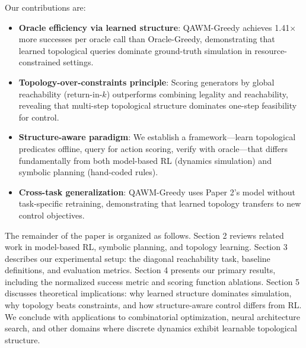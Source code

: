 Our contributions are:

\begin{itemize}
\item \textbf{Oracle efficiency via learned structure}: QAWM-Greedy achieves 1.41$\times$ more successes per oracle call than Oracle-Greedy, demonstrating that learned topological queries dominate ground-truth simulation in resource-constrained settings.
\item \textbf{Topology-over-constraints principle}: Scoring generators by global reachability (return-in-$k$) outperforms combining legality and reachability, revealing that multi-step topological structure dominates one-step feasibility for control.
\item \textbf{Structure-aware paradigm}: We establish a framework—learn topological predicates offline, query for action scoring, verify with oracle—that differs fundamentally from both model-based RL (dynamics simulation) and symbolic planning (hand-coded rules).
\item \textbf{Cross-task generalization}: QAWM-Greedy uses Paper 2's model without task-specific retraining, demonstrating that learned topology transfers to new control objectives.
\end{itemize}

The remainder of the paper is organized as follows. Section 2 reviews related work in model-based RL, symbolic planning, and topology learning. Section 3 describes our experimental setup: the diagonal reachability task, baseline definitions, and evaluation metrics. Section 4 presents our primary results, including the normalized success metric and scoring function ablations. Section 5 discusses theoretical implications: why learned structure dominates simulation, why topology beats constraints, and how structure-aware control differs from RL. We conclude with applications to combinatorial optimization, neural architecture search, and other domains where discrete dynamics exhibit learnable topological structure.
